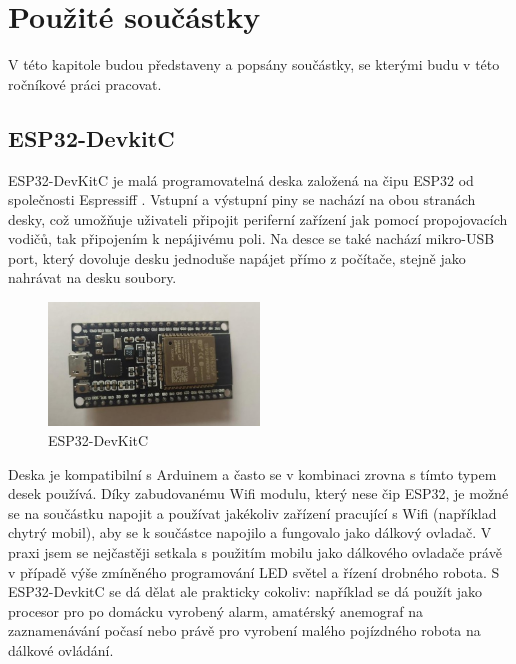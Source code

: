 \chapter{Použité součástky}
V této kapitole budou představeny a popsány součástky, se kterými budu v této ročníkové práci pracovat.

\section{ESP32-DevkitC}
ESP32-DevKitC \cite{devkitc-datasheet} je malá programovatelná deska založená na čipu ESP32 od společnosti Espressiff \cite{espressif}. Vstupní a výstupní piny se nachází na obou stranách desky, což umožňuje uživateli připojit periferní zařízení jak pomocí propojovacích vodičů, tak připojením k nepájivému poli. Na desce se také nachází mikro-USB port, který dovoluje  desku jednoduše napájet přímo z počítače, stejně jako nahrávat na desku soubory. \cite{devkitc}

\begin{figure}[htbp]
	\centering
	\includegraphics[width=0.5\textwidth]{img/ESPDevKit3.jpg}
	\caption{ESP32-DevKitC}
\end{figure}

Deska je kompatibilní s Arduinem \cite{arduino} a často se v kombinaci zrovna s tímto typem desek používá. Díky zabudovanému Wifi modulu, který nese čip ESP32,\cite{ESP32} je možné se na součástku napojit a používat jakékoliv zařízení pracující s Wifi (například chytrý mobil), aby se k součástce napojilo a fungovalo jako dálkový ovladač. V praxi jsem se nejčastěji setkala s použitím mobilu jako dálkového ovladače právě v případě výše zmíněného programování LED světel a řízení drobného robota. S ESP32-DevkitC se dá dělat ale prakticky cokoliv: například se dá použít jako procesor pro po domácku vyrobený alarm, amatérský anemograf na zaznamenávání počasí nebo právě pro  vyrobení malého pojízdného robota na dálkové ovládání. 

